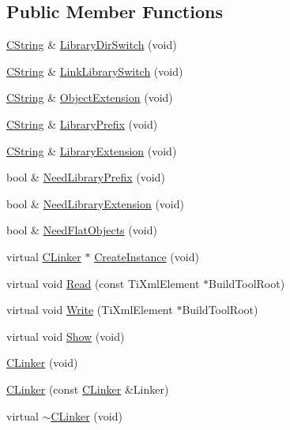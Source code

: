 \subsection*{Public Member Functions}
\begin{DoxyCompactItemize}
\item 
\hyperlink{classCString}{C\-String} \& \hyperlink{classCLinker_af3b1d957d4f12e01c0426b094bfc3f4b}{Library\-Dir\-Switch} (void)
\item 
\hyperlink{classCString}{C\-String} \& \hyperlink{classCLinker_a5ed2852d1da83e08ca9006c80dd6208b}{Link\-Library\-Switch} (void)
\item 
\hyperlink{classCString}{C\-String} \& \hyperlink{classCLinker_a368f5e7adece962a799896ca47494e8b}{Object\-Extension} (void)
\item 
\hyperlink{classCString}{C\-String} \& \hyperlink{classCLinker_a0e30da82690cd233d51e644d9c3ad367}{Library\-Prefix} (void)
\item 
\hyperlink{classCString}{C\-String} \& \hyperlink{classCLinker_a324c41a9b833e91ec238ca0552e0a654}{Library\-Extension} (void)
\item 
bool \& \hyperlink{classCLinker_ab1681c03a2c3998087fb31f022567ba2}{Need\-Library\-Prefix} (void)
\item 
bool \& \hyperlink{classCLinker_a5be0c19dd3df62d8c9114752ad525a7b}{Need\-Library\-Extension} (void)
\item 
bool \& \hyperlink{classCLinker_a9c5f276b64848af6a188424b68d2fe0e}{Need\-Flat\-Objects} (void)
\item 
virtual \hyperlink{classCLinker}{C\-Linker} $\ast$ \hyperlink{classCLinker_a9b644b9c906436f75b394f2324d811d3}{Create\-Instance} (void)
\item 
virtual void \hyperlink{classCLinker_a6db5ff1a933b56855b2bfb9260f46dce}{Read} (const Ti\-Xml\-Element $\ast$Build\-Tool\-Root)
\item 
virtual void \hyperlink{classCLinker_ad2b70ef5f824d2697b4f12579415dca3}{Write} (Ti\-Xml\-Element $\ast$Build\-Tool\-Root)
\item 
virtual void \hyperlink{classCLinker_aa2c99f02f4433dfae7cdc0654b901582}{Show} (void)
\item 
\hyperlink{classCLinker_a8ed62e385faa10d72320ca590c67113f}{C\-Linker} (void)
\item 
\hyperlink{classCLinker_a0bc98af914fde1c3d7c54647739ee4b8}{C\-Linker} (const \hyperlink{classCLinker}{C\-Linker} \&Linker)
\item 
virtual \hyperlink{classCLinker_a3e57506f54acf2c76fc1427b4e005033}{$\sim$\-C\-Linker} (void)
\end{DoxyCompactItemize}
